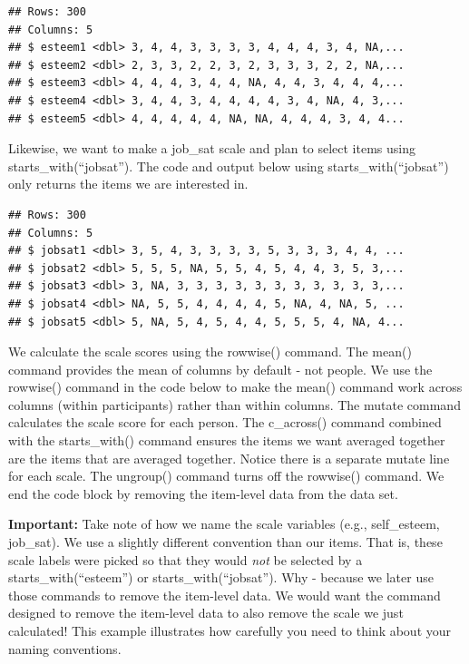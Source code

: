 \documentclass[
]{krantz}
\makeatletter
\newenvironment{Shaded}{\begin{snugshade}}{\end{snugshade}}
\newcommand{\KeywordTok}[1]{\textcolor[rgb]{0.27,0.27,0.27}{\textbf{#1}}}
\newcommand{\NormalTok}[1]{#1}
\newcommand{\OperatorTok}[1]{\textcolor[rgb]{0.43,0.43,0.43}{\textbf{#1}}}
\newcommand{\StringTok}[1]{\textcolor[rgb]{0.5,0.5,0.5}{#1}}
\newenvironment{kframe}{%
\medskip{}
\setlength{\fboxsep}{.8em}
 \def\at@end@of@kframe{}%
 \ifinner\ifhmode%
  \def\at@end@of@kframe{\end{minipage}}%
  \begin{minipage}{\columnwidth}%
 \fi\fi%
 \def\FrameCommand##1{\hskip\@totalleftmargin \hskip-\fboxsep
 \colorbox{shadecolor}{##1}\hskip-\fboxsep
     \hskip-\linewidth \hskip-\@totalleftmargin \hskip\columnwidth}%
 \MakeFramed {\advance\hsize-\width
   \@totalleftmargin\z@ \linewidth\hsize
   \@setminipage}}%
 {\par\unskip\endMakeFramed%
 \at@end@of@kframe}
\renewenvironment{Shaded}{\begin{kframe}}{\end{kframe}}
\makeatother
\begin{document}
\begin{verbatim}
## Rows: 300
## Columns: 5
## $ esteem1 <dbl> 3, 4, 4, 3, 3, 3, 3, 4, 4, 4, 3, 4, NA,...
## $ esteem2 <dbl> 2, 3, 3, 2, 2, 3, 2, 3, 3, 3, 2, 2, NA,...
## $ esteem3 <dbl> 4, 4, 4, 3, 4, 4, NA, 4, 4, 3, 4, 4, 4,...
## $ esteem4 <dbl> 3, 4, 4, 3, 4, 4, 4, 4, 3, 4, NA, 4, 3,...
## $ esteem5 <dbl> 4, 4, 4, 4, 4, NA, NA, 4, 4, 4, 3, 4, 4...
\end{verbatim}

Likewise, we want to make a job\_sat scale and plan to select items using starts\_with(``jobsat''). The code and output below using starts\_with(``jobsat'') only returns the items we are interested in.

\begin{Shaded}
\end{Shaded}

\begin{verbatim}
## Rows: 300
## Columns: 5
## $ jobsat1 <dbl> 3, 5, 4, 3, 3, 3, 3, 5, 3, 3, 3, 4, 4, ...
## $ jobsat2 <dbl> 5, 5, 5, NA, 5, 5, 4, 5, 4, 4, 3, 5, 3,...
## $ jobsat3 <dbl> 3, NA, 3, 3, 3, 3, 3, 3, 3, 3, 3, 3, 3,...
## $ jobsat4 <dbl> NA, 5, 5, 4, 4, 4, 4, 5, NA, 4, NA, 5, ...
## $ jobsat5 <dbl> 5, NA, 5, 4, 5, 4, 4, 5, 5, 5, 4, NA, 4...
\end{verbatim}

We calculate the scale scores using the rowwise() command. The mean() command provides the mean of columns by default - not people. We use the rowwise() command in the code below to make the mean() command work across columns (within participants) rather than within columns. The mutate command calculates the scale score for each person. The c\_across() command combined with the starts\_with() command ensures the items we want averaged together are the items that are averaged together. Notice there is a separate mutate line for each scale. The ungroup() command turns off the rowwise() command. We end the code block by removing the item-level data from the data set.

\textbf{Important:} Take note of how we name the scale variables (e.g., self\_esteem, job\_sat). We use a slightly different convention than our items. That is, these scale labels were picked so that they would \emph{not} be selected by a starts\_with(``esteem'') or starts\_with(``jobsat''). Why - because we later use those commands to remove the item-level data. We would want the command designed to remove the item-level data to also remove the scale we just calculated! This example illustrates how carefully you need to think about your naming conventions.
\end{document}
